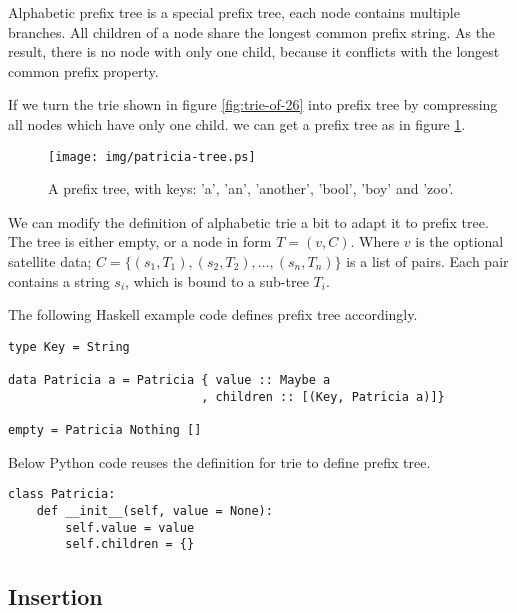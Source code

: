 \documentclass{article}
\begin{document}
Alphabetic prefix tree is a special prefix tree, each node contains
multiple branches. All children of a node share the longest common
prefix string. As the result, there is no node with only one child,
because it conflicts with the longest common prefix property.

If we turn the trie shown in figure \ref{fig:trie-of-26} into prefix tree
by compressing all nodes which have only one child. we can get
a prefix tree as in figure \ref{fig:patricia-tree}.

\begin{figure}[htbp]
  \centering
  \texttt{[image: img/patricia-tree.ps]}
  \caption{A prefix tree, with keys: 'a', 'an', 'another', 'bool',
    'boy' and 'zoo'.}
  \label{fig:patricia-tree}
\end{figure}

We can modify the definition of alphabetic trie a bit to adapt it
to prefix tree. The tree is either empty, or a node in form $T = (v, C)$.
Where $v$ is the optional satellite data; $C = \{(s_1, T_1), (s_2, T_2), ..., (s_n, T_n)\}$
is a list of pairs. Each pair contains a string $s_i$, which is bound
to a sub-tree $T_i$.

The following Haskell example code defines prefix tree accordingly.

\lstset{language=Haskell}
\begin{lstlisting}
type Key = String

data Patricia a = Patricia { value :: Maybe a
                           , children :: [(Key, Patricia a)]}

empty = Patricia Nothing []
\end{lstlisting}

Below Python code reuses the definition for trie to define prefix tree.

\lstset{language=Python}
\begin{lstlisting}
class Patricia:
    def __init__(self, value = None):
        self.value = value
        self.children = {}
\end{lstlisting}

\subsection{Insertion}
\end{document}
